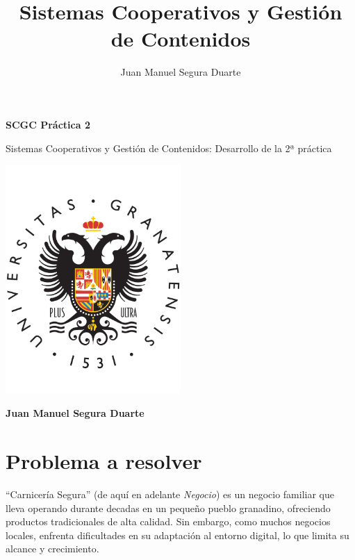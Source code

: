 \documentclass[a4paper]{article}
\title{Sistemas Cooperativos y Gestión de Contenidos}
\author{Juan Manuel Segura Duarte}
\begin{document}
\begin{titlepage}
    \centering
    \vspace*{3cm}  %
    {\Huge \textbf{SCGC Práctica 2}} %
    \vspace{1cm}
    
    {\Large Sistemas Cooperativos y Gestión de Contenidos: Desarrollo de la 2ª práctica} %
    
    \includegraphics[width=0.5\textwidth]{images/ugr-logo.png}
    \vspace{1cm}
    
    \textbf{\Large Juan Manuel Segura Duarte} %
\end{titlepage}
\newpage

\thispagestyle{empty}
\tableofcontents


\newpage
{}
\setcounter{page}{1}

\section{Problema a resolver}

``Carnicería Segura'' (de aquí en adelante \textit{Negocio}) es un negocio familiar que lleva operando durante decadas en un pequeño pueblo granadino, ofreciendo productos tradicionales de alta calidad. Sin embargo, como muchos negocios locales, enfrenta dificultades en su adaptación al entorno digital, lo que limita su alcance y crecimiento.
\end{document}

